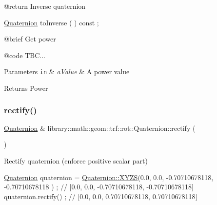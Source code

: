 \begin{DoxyCode}
    @\textcolor{keywordflow}{return}             Inverse quaternion

\hyperlink{classlibrary_1_1math_1_1geom_1_1trf_1_1rot_1_1_quaternion_aa7f459a08f5af38b9f7676a6bf36a21c}{Quaternion}              toInverse                                   ( ) \textcolor{keyword}{const} ;

    @brief              Get power
   
    @code
                        TBC...
\end{DoxyCode}



\begin{DoxyParams}[1]{Parameters}
\mbox{\tt in}  & {\em a\+Value} & A power value \\
\hline
\end{DoxyParams}
\begin{DoxyReturn}{Returns}
Power 
\end{DoxyReturn}
\mbox{\label{classlibrary_1_1math_1_1geom_1_1trf_1_1rot_1_1_quaternion_a41cbb9a19380bd08110455190a0a9770}} 
\subsubsection{\texorpdfstring{rectify()}{rectify()}}
{\footnotesize\ttfamily \hyperlink{classlibrary_1_1math_1_1geom_1_1trf_1_1rot_1_1_quaternion}{Quaternion} \& library\+::math\+::geom\+::trf\+::rot\+::\+Quaternion\+::rectify (\begin{DoxyParamCaption}{ }\end{DoxyParamCaption})}



Rectify quaternion (enforce positive scalar part) 


\begin{DoxyCode}
\hyperlink{classlibrary_1_1math_1_1geom_1_1trf_1_1rot_1_1_quaternion_aa7f459a08f5af38b9f7676a6bf36a21c}{Quaternion} quaternion = \hyperlink{classlibrary_1_1math_1_1geom_1_1trf_1_1rot_1_1_quaternion_afff9523c7dcbfbbc521736121e62ad41}{Quaternion::XYZS}(0.0, 0.0, -0.70710678118, -0.70710678118
      ) ; \textcolor{comment}{// [0.0, 0.0, -0.70710678118, -0.70710678118]}
quaternion.rectify() ; \textcolor{comment}{// [0.0, 0.0, 0.70710678118, 0.70710678118]}
\end{DoxyCode}


